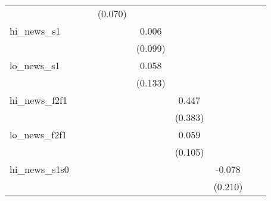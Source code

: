 {\begin{tabular}{l*{8}{c}}
            &                     &                     &     (0.070)         &                     &                     &                     &                     &                     \\
\addlinespace
hi\_news\_s1  &                     &                     &                     &       0.006         &                     &                     &                     &                     \\
            &                     &                     &                     &     (0.099)         &                     &                     &                     &                     \\
\addlinespace
lo\_news\_s1  &                     &                     &                     &       0.058         &                     &                     &                     &                     \\
            &                     &                     &                     &     (0.133)         &                     &                     &                     &                     \\
\addlinespace
hi\_news\_f2f1&                     &                     &                     &                     &       0.447         &                     &                     &                     \\
            &                     &                     &                     &                     &     (0.383)         &                     &                     &                     \\
\addlinespace
lo\_news\_f2f1&                     &                     &                     &                     &       0.059         &                     &                     &                     \\
            &                     &                     &                     &                     &     (0.105)         &                     &                     &                     \\
\addlinespace
hi\_news\_s1s0&                     &                     &                     &                     &                     &      -0.078         &                     &                     \\
            &                     &                     &                     &                     &                     &     (0.210)         &                     &                     \\

\end{tabular}}
